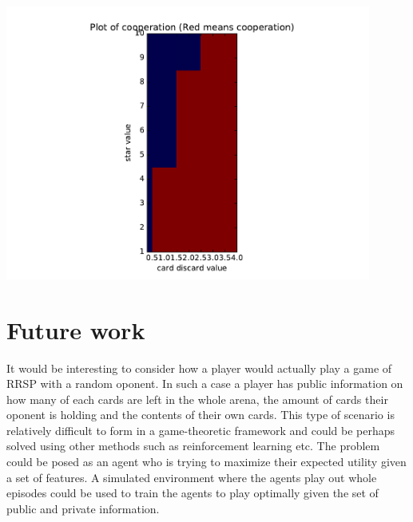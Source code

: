 \documentclass[11pt]{article}
\begin{document}
\includegraphics[width=12cm]{ranges} \\

\vspace{2mm}

\section{Future work}
It would be interesting to consider how a player would actually play a game of RRSP with a random oponent. In such a case
a player has public information on how many of each cards are left in the whole arena, the amount of cards their oponent is holding and 
the contents of their own cards. This type of scenario is relatively difficult to form in a game-theoretic framework and could be perhaps solved
using other methods such as reinforcement learning etc. The problem could be posed as an agent who is trying to maximize their expected utility given a set of features. A simulated environment where the agents play out whole episodes could be used to train the agents to play optimally given the set of public and private information.
\end{document}
